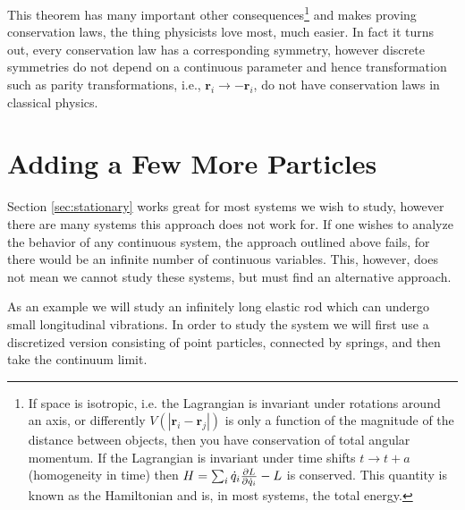 This theorem has many important other consequences\footnote{If space is isotropic, i.e. the Lagrangian is invariant under rotations around an axis, or differently $V(|\mathbf{r}_i - \mathbf{r}_j|)$ is only a function of the magnitude of the distance between objects, then you have conservation of total angular momentum. If the Lagrangian is invariant under time shifts $t\to t + a$ (homogeneity in time) then $H = \sum_i\dot{q}_i\pdv{L}{\dot{q}_i} - L$ is conserved. This quantity is known as the Hamiltonian and is, in most systems, the total energy.} and makes proving conservation laws, the thing physicists love most, much easier. In fact it turns out, every conservation law has a corresponding symmetry, however discrete symmetries do not depend on a continuous parameter and hence transformation such as parity transformations, i.e.,  $\mathbf{r}_i\to-\mathbf{r}_i$, do not have conservation laws in classical physics.

\section{Adding a Few More Particles}\label{moreParticles}
Section \ref{sec:stationary} works great for most systems we wish to study, however there are many systems this approach does not work for. If one wishes to analyze the behavior of any continuous system, the approach outlined above fails, for there would be an infinite number of continuous variables. This, however, does not mean we cannot study these systems, but must find an alternative approach.

As an example we will study an infinitely long elastic rod which can undergo small longitudinal vibrations. In order to study the system we will first use a discretized version consisting of point particles, connected by springs, and then take the continuum limit.

